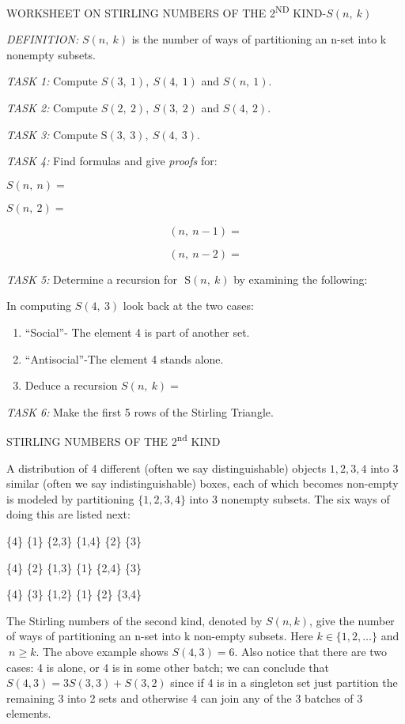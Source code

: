 \documentclass[10pt,letter]{article}
\begin{document}
WORKSHEET ON STIRLING NUMBERS OF THE 2\textsuperscript{ND}
KIND-\(S(n,\ k)\)

\emph{DEFINITION:} \(S\left( n,\ k \right)\) is the number of ways of
partitioning an n-set into k nonempty subsets.

\emph{TASK 1:} Compute \(S\left( 3,\ 1 \right),\ S(4,\ 1)\) and
\(S(n,\ 1)\).

\emph{TASK 2:} Compute \(S\left( 2,\ 2 \right),\ S(3,\ 2)\) and
\(S(4,\ 2)\).

\emph{TASK 3:} Compute\(\text{\ S}\left( 3,\ 3 \right),\ S(4,\ 3)\).

\emph{TASK 4:} Find formulas and give \emph{proofs} for:

\(S\left( n,\ n \right) =\)

\(S\left( n,\ 2 \right) =\)

\[
\left( n,\ n - 1 \right) =
\]

\[
\left( n,\ n - 2 \right) =
\]

\emph{TASK 5:} Determine a recursion for
\(\text{\ S}\left( n,\ k \right)\) by examining the following:

In computing \(S\left( 4,\ 3 \right)\) look back at the two cases:

\begin{enumerate}
\def\labelenumi{(\alph{enumi})}

\item
  ``Social''- The element 4 is part of another set.
\item
  ``Antisocial''-The element 4 stands alone.
\item
  Deduce a recursion \(S\left( n,\ k \right) =\)

\end{enumerate}

\emph{TASK 6:} Make the first 5 rows of the Stirling Triangle.

STIRLING NUMBERS OF THE 2\textsuperscript{nd} KIND

A distribution of 4 different (often we say distinguishable) objects
\(1,2,3,4\) into 3 similar (often we say indistinguishable) boxes, each
of which becomes non-empty is modeled by partitioning \(\{ 1,2,3,4\}\)
into 3 nonempty subsets. The six ways of doing this are listed next:

\{4\} \{1\} \{2,3\} \{1,4\} \{2\} \{3\}

\{4\} \{2\} \{1,3\} \{1\} \{2,4\} \{3\}

\{4\} \{3\} \{1,2\} \{1\} \{2\} \{3,4\}

The Stirling numbers of the second kind, denoted by \(S(n,k)\), give the
number of ways of partitioning an n-set into k non-empty subsets. Here
\(k \in \{ 1,2,\ldots\}\) and\(\ n \geq k\). The above example shows
\(S\left( 4,3 \right) = 6\). Also notice that there are two cases: 4 is
alone, or 4 is in some other batch; we can conclude that
\(S\left( 4,3 \right) = 3S\left( 3,3 \right) + S(3,2)\) since if 4 is in
a singleton set just partition the remaining 3 into 2 sets and otherwise
4 can join any of the 3 batches of 3 elements.
\end{document}
